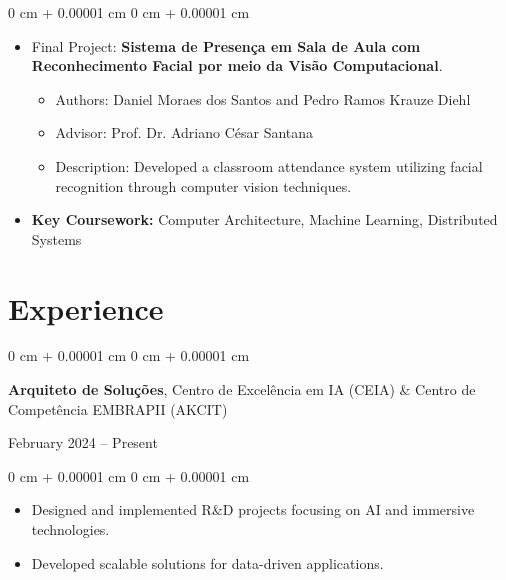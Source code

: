 \documentclass[10pt, letterpaper]{article}
\newenvironment{highlights}{
    \begin{itemize}[
        topsep=0.10 cm,
        parsep=0.10 cm,
        partopsep=0pt,
        itemsep=0pt,
        leftmargin=0 cm + 10pt
    ]
}{
    \end{itemize}
} %
\newenvironment{highlightsforbulletentries}{
    \begin{itemize}[
        topsep=0.10 cm,
        parsep=0.10 cm,
        partopsep=0pt,
        itemsep=0pt,
        leftmargin=10pt
    ]
}{
    \end{itemize}
} %
\newenvironment{onecolentry}{
    \begin{adjustwidth}{
        0 cm + 0.00001 cm
    }{
        0 cm + 0.00001 cm
    }
}{
    \end{adjustwidth}
} %
\newenvironment{twocolentry}[2][]{
    \onecolentry
    \def\secondColumn{#2}
    \setcolumnwidth{\fill, 4.5 cm}
    \begin{paracol}{2}
}{
    \switchcolumn \raggedleft \secondColumn
    \end{paracol}
    \endonecolentry
} %
\begin{document}
        \vspace{0.10 cm}
        \begin{onecolentry}
            \begin{highlights}
                \item Final Project: \textbf{Sistema de Presença em Sala de Aula com Reconhecimento Facial por meio da Visão Computacional}.
                \begin{highlightsforbulletentries}
                    \item Authors: Daniel Moraes dos Santos and Pedro Ramos Krauze Diehl
                    \item Advisor: Prof. Dr. Adriano César Santana
                    \item Description: Developed a classroom attendance system utilizing facial recognition through computer vision techniques.
                \end{highlightsforbulletentries}
                \item \textbf{Key Coursework:} Computer Architecture, Machine Learning, Distributed Systems
            \end{highlights}
        \end{onecolentry}


    \section{Experience}

        \begin{twocolentry}{
            February 2024 – Present
        }
            \textbf{Arquiteto de Soluções}, Centro de Excelência em IA (CEIA) \& Centro de Competência EMBRAPII (AKCIT)
        \end{twocolentry}
        \vspace{0.10 cm}
        \begin{onecolentry}
            \begin{highlights}
                \item Designed and implemented R\&D projects focusing on AI and immersive technologies.
                \item Developed scalable solutions for data-driven applications.
            \end{highlights}
        \end{onecolentry}

        \vspace{0.2 cm}
\end{document}

